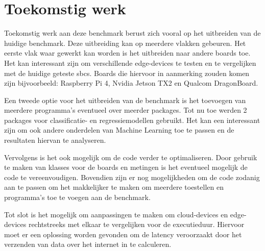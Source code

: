 	
	\newpage
	\section{Toekomstig werk}
	
		
	Toekomstig werk aan deze benchmark berust zich vooral op het uitbreiden van de huidige benchmark. Deze uitbreiding kan op meerdere vlakken gebeuren. Het eerste vlak waar gewerkt kan worden is het uitbreiden naar andere boards toe. Het kan interessant zijn om verschillende edge-devices te testen en te vergelijken met de huidige geteste \gls{sbc}s. Boards die hiervoor in aanmerking zouden komen zijn bijvoorbeeld: Raspberry Pi 4, Nvidia Jetson TX2 en Qualcom DragonBoard.
	
	Een tweede optie voor het uitbreiden van de benchmark is het toevoegen van meerdere programma's eventueel over meerder packages. Tot nu toe werden 2 packages voor classificatie- en regressiemodellen gebruikt. Het kan een interessant zijn om ook andere onderdelen van Machine Learning toe te passen en de resultaten hiervan te analyseren.
	
	Vervolgens is het ook mogelijk om de code verder te optimaliseren. Door gebruik te maken van klasses voor de boards en metingen is het eventueel mogelijk de code te vereenvoudigen. Bovendien zijn er nog mogelijkheden om de code zodanig aan te passen om het makkelijker te maken om meerdere toestellen en programma's toe te voegen aan de benchmark.
	
	Tot slot is het mogelijk om aanpassingen te maken om cloud-devices en edge-devices rechtstreeks met elkaar te vergelijken voor de executieduur. Hiervoor moet er een oplossing worden gevonden om de latency veroorzaakt door het verzenden van data over het internet in te calculeren.
	
	
	
	
	
	
	
	
	
	